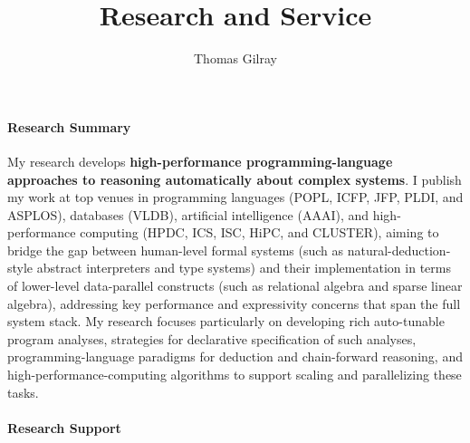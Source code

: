 \documentclass[12pt]{article}
\begin{document}
\title{Research and Service}
\author{Thomas Gilray}
\date{}
\maketitle
\vspace{-1.25cm}
\small

\paragraph{Research Summary}

My research develops \textbf{high-performance programming-language approaches to reasoning automatically about complex systems}. I publish my work at top venues in programming languages (POPL, ICFP, JFP, PLDI, and ASPLOS), databases (VLDB), artificial intelligence (AAAI), and high-performance computing (HPDC, ICS, ISC, HiPC, and CLUSTER), aiming to bridge the gap between human-level formal systems (such as natural-deduction-style abstract interpreters and type systems) and their implementation in terms of lower-level data-parallel constructs (such as relational algebra and sparse linear algebra), addressing key performance and expressivity concerns that span the full system stack. My research focuses particularly on developing rich auto-tunable program analyses, strategies for declarative specification of such analyses, programming-language paradigms for deduction and chain-forward reasoning, and high-performance-computing algorithms to support scaling and parallelizing these tasks.


\paragraph{Research Support}
\end{document}
